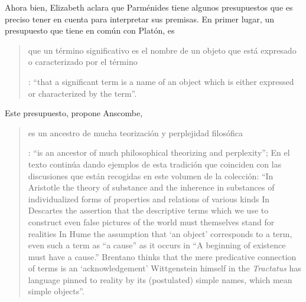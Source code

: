 Ahora bien, Elizabeth aclara que Parménides tiene algunos presupuestos que es preciso tener en cuenta para interpretar sus premisas. En primer lugar, un presupuesto que tiene en común con Platón, es \blockquote[{\Cite[x]{anscombe1981parmenides}}: \enquote{that a significant term is a name of an object which is either expressed or characterized by the term}.]{que un término significativo es el nombre de un objeto que está expresado o caracterizado por el término}. Este presupuesto, propone Anscombe, \blockquote[{\Cite[xi]{anscombe1981parmenides}}: \enquote{is an ancestor of much philosophical theorizing and perplexity}; En el texto continúa dando ejemplos de esta tradición que coinciden con las discusiones que están recogidas en este volumen de la colección: \enquote{In Aristotle \textelp{} the theory of substance and the inherence in substances of individualized forms of properties and relations of various kinds \textelp{} In Descartes \textelp{} the assertion that the descriptive terms which we use to construct even false pictures of the world must themselves stand for realities \textelp{} In Hume \textelp{} the assumption that `an object' corresponds to a term, even such a term as ``a cause'' as it occurs in ``A beginning of existence must have a cause.'' \textelp{} Brentano thinks that the mere predicative connection of terms is an `acknowledgement' \textelp{} Wittgenstein himself in the \emph{Tractatus} has language pinned to reality by its (postulated) simple names, which mean simple objects}.]{es un ancestro de mucha teorización y perplejidad filosófica}.

